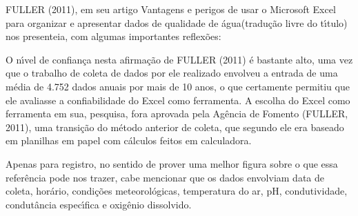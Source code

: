 \documentclass[
12pt,		%
openright,	%
twoside,  %
a4paper,			%
chapter=TITLE,		%
english,			%
french,				%
spanish,			%
brazil				%
]{USPSC-classe/USPSC}
\begin{document}
FULLER (2011), em seu artigo \textquotedbl Vantagens e perigos de usar o Microsoft Excel para organizar e apresentar dados de qualidade de \'agua\textquotedbl  (tradu\c{c}\~ao livre do t\'{\i}tulo) nos presenteia, com algumas importantes reflex\~oes:


















\noindent\begin{center}\mbox{\centering{}}\end{center}


O n\'{\i}vel de confian\c{c}a nesta afirma\c{c}\~ao de  FULLER (2011) \'e bastante alto, uma vez que o trabalho de coleta de dados por ele realizado envolveu a entrada de uma m\'edia de 4.752 dados anuais por mais de 10 anos, o que certamente permitiu que ele avaliasse a confiabilidade do Excel como ferramenta. A escolha do Excel como ferramenta em sua, pesquisa, fora aprovada pela Ag\^encia de Fomento  (FULLER, 2011), uma transi\c{c}\~ao do m\'etodo anterior de coleta, que segundo ele era baseado em planilhas em papel com c\'alculos feitos em calculadora.

















Apenas para registro, no sentido de prover uma melhor figura sobre o que essa refer\^encia pode nos trazer, cabe mencionar que os dados envolviam data de coleta, hor\'ario, condi\c{c}\~oes meteorol\'ogicas, temperatura do ar, pH, condutividade, condut\^ancia espec\'{\i}fica e oxig\^enio dissolvido.
\end{document}
